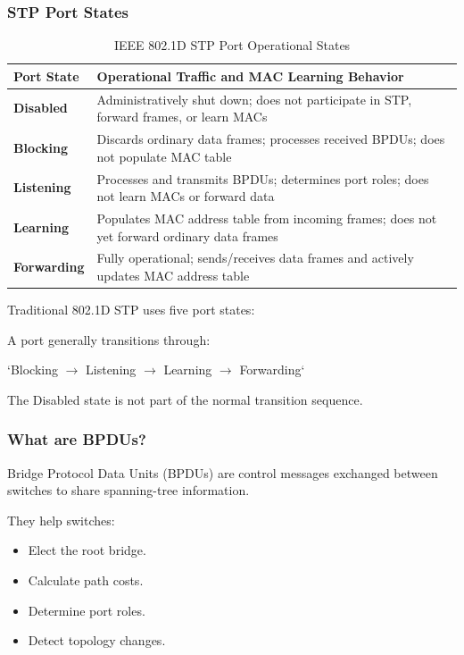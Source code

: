 \subsubsection{STP Port States}
\begin{table}[htbp]
\centering
\caption{IEEE 802.1D STP Port Operational States}
\label{tab:stp_port_states}
\begin{tabularx}{\textwidth}{p{2.8cm} X}
\toprule
\textbf{Port State} & \textbf{Operational Traffic and MAC Learning Behavior} \\
\midrule
\textbf{Disabled} & Administratively shut down; does not participate in STP, forward frames, or learn MACs \\
\textbf{Blocking} & Discards ordinary data frames; processes received BPDUs; does not populate MAC table \\
\textbf{Listening} & Processes and transmits BPDUs; determines port roles; does not learn MACs or forward data \\
\textbf{Learning} & Populates MAC address table from incoming frames; does not yet forward ordinary data frames \\
\textbf{Forwarding} & Fully operational; sends/receives data frames and actively updates MAC address table \\
\bottomrule
\end{tabularx}
\end{table}

Traditional 802.1D STP uses five port states:


A port generally transitions through:

`Blocking $\to$ Listening $\to$ Learning $\to$ Forwarding`

The Disabled state is not part of the normal transition sequence.

\subsubsection{What are BPDUs?}

Bridge Protocol Data Units (BPDUs) are control messages exchanged between switches to share spanning-tree information.

They help switches:

\begin{itemize}
\item Elect the root bridge.
\item Calculate path costs.
\item Determine port roles.
\item Detect topology changes.
\end{itemize}

